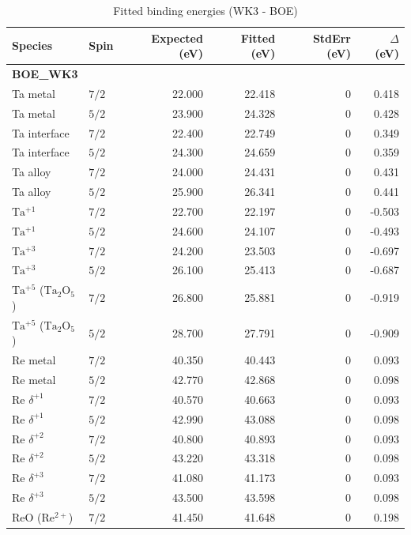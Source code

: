 \documentclass[12pt]{article}
\begin{document}
\begin{table}[H]
\centering
\begin{threeparttable}
\caption{Fitted binding energies (WK3 - BOE)}
\begin{tabular}{llrrrr}
\toprule
Species & Spin & Expected (eV) & Fitted (eV) & StdErr (eV) & $\Delta$ (eV) \\
\midrule
\multicolumn{6}{l}{\textbf{BOE\_WK3}} \\
Ta metal & $7/2$ & 22.000 & 22.418 & 0 & 0.418 \\
Ta metal & $5/2$ & 23.900 & 24.328 & 0 & 0.428 \\
Ta interface & $7/2$ & 22.400 & 22.749 & 0 & 0.349 \\
Ta interface & $5/2$ & 24.300 & 24.659 & 0 & 0.359 \\
Ta alloy & $7/2$ & 24.000 & 24.431 & 0 & 0.431 \\
Ta alloy & $5/2$ & 25.900 & 26.341 & 0 & 0.441 \\
$\mathrm{Ta^{+1}}$ & $7/2$ & 22.700 & 22.197 & 0 & -0.503 \\
$\mathrm{Ta^{+1}}$ & $5/2$ & 24.600 & 24.107 & 0 & -0.493 \\
$\mathrm{Ta^{+3}}$ & $7/2$ & 24.200 & 23.503 & 0 & -0.697 \\
$\mathrm{Ta^{+3}}$ & $5/2$ & 26.100 & 25.413 & 0 & -0.687 \\
$\mathrm{Ta^{+5}}$ ($\mathrm{Ta_2O_5}$) & $7/2$ & 26.800 & 25.881 & 0 & -0.919 \\
$\mathrm{Ta^{+5}}$ ($\mathrm{Ta_2O_5}$) & $5/2$ & 28.700 & 27.791 & 0 & -0.909 \\
Re metal & $7/2$ & 40.350 & 40.443 & 0 & 0.093 \\
Re metal & $5/2$ & 42.770 & 42.868 & 0 & 0.098 \\
$\mathrm{Re}$ $\delta^{+1}$ & $7/2$ & 40.570 & 40.663 & 0 & 0.093 \\
$\mathrm{Re}$ $\delta^{+1}$ & $5/2$ & 42.990 & 43.088 & 0 & 0.098 \\
$\mathrm{Re}$ $\delta^{+2}$ & $7/2$ & 40.800 & 40.893 & 0 & 0.093 \\
$\mathrm{Re}$ $\delta^{+2}$ & $5/2$ & 43.220 & 43.318 & 0 & 0.098 \\
$\mathrm{Re}$ $\delta^{+3}$ & $7/2$ & 41.080 & 41.173 & 0 & 0.093 \\
$\mathrm{Re}$ $\delta^{+3}$ & $5/2$ & 43.500 & 43.598 & 0 & 0.098 \\
$\mathrm{ReO}$ ($\mathrm{Re^{2+}}$) & $7/2$ & 41.450 & 41.648 & 0 & 0.198 \\

\end{tabular}
\end{threeparttable}
\end{table}
\end{document}
